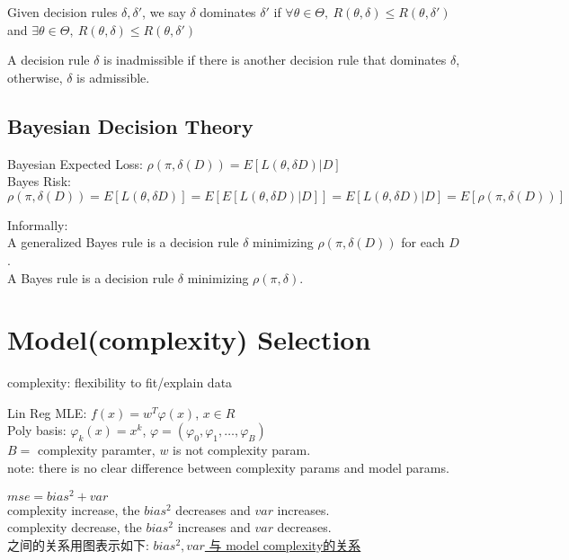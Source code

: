 \documentclass{article}
\begin{document}
\begin{definition}
Given decision rules $\delta, \delta'$, we say $\delta$ dominates $\delta'$ 
if $\forall \theta \in \Theta,\ R(\theta, \delta) \leq R(\theta, \delta')$
and $\exists \theta \in \Theta,\ R(\theta, \delta) \le R(\theta, \delta')$
\end{definition}

\begin{definition}
A decision rule $\delta$ is inadmissible if there is another decision rule that dominates $\delta$, otherwise, $\delta$ is admissible.
\end{definition}

\subsection{Bayesian Decision Theory}
\noindent
Bayesian Expected Loss: $\rho(\pi, \delta(D)) = E[L(\theta, \delta{D}) | D]$\\
Bayes Risk: $\rho(\pi, \delta(D)) = E[L(\theta, \delta{D})] = E[E[L(\theta, \delta{D}) | D]] = E[L(\theta, \delta{D})|D] = E[\rho(\pi, \delta(D))]$

Informally:\\
A generalized Bayes rule is a decision rule $\delta$ minimizing $\rho(\pi, \delta(D))$ for each $D$.\\
A Bayes rule is a decision rule $\delta$ minimizing $\rho(\pi, \delta)$.

\section{Model(complexity) Selection}
complexity: flexibility to fit/explain data

\begin{example}
Lin Reg MLE: $f(x) = w^T \varphi(x)$, $x \in R$\\
Poly basis: $\varphi_k(x) = x^k$, $\varphi = (\varphi_0, \varphi_1, \ldots, \varphi_B)$\\
$B = $ complexity paramter, $w$ is not complexity param.\\
note: there is no clear difference between complexity params and model params.
\end{example}

$mse = bias^2 + var$\\
complexity increase, the $bias^2$ decreases and $var$ increases.\\
complexity decrease, the $bias^2$ increases and $var$ decreases.\\
之间的关系用图表示如下: \href{http://i.imgbox.com/mk9txD2Z.png}{$bias^2, var$ 与 model complexity的关系}
\end{document}
